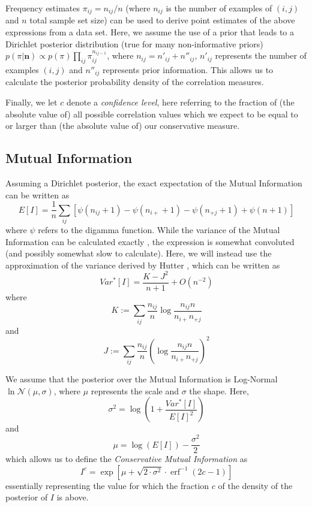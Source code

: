 \documentclass[conference]{IEEEtran}
\newcommand{\digamma}{\psi}
\newcommand{\lgammalocation}{\mu}
\newcommand{\lgammascale}{\sigma}
\DeclareMathOperator\erf{erf}
\begin{document}
Frequency estimates $\pi_{ij} = n_{ij} / n$ (where $n_{ij}$ is the number of examples of $(i,j)$ and $n$ total sample set size) can be used to derive point estimates of the above expressions from a data set. Here, we assume the use of a prior that leads to a Dirichlet posterior distribution (true for many non-informative priors) $p(\pi|\pmb{n}) \propto p(\pi) \prod_{ij} \pi_{ij}^{n_{ij-1}} $, where $n_{ij} = n'_{ij} + n''_{ij}$, $n'_{ij}$ represents the number of examples $(i,j)$ and $n''_{ij}$ represents prior information. This allows us to calculate the posterior probability density of the correlation measures.

Finally, we let $c$ denote a \emph{confidence level}, here referring to the fraction of (the absolute value of) all possible correlation values which we expect to be equal to or larger than (the absolute value of) our conservative measure.

\subsection{Mutual Information}

Assuming a Dirichlet posterior, the exact expectation of the Mutual Information can be written as
\begin{equation}
\label{eq:miexp}
E[I] = \frac{1}{n} \sum_{ij} [ \digamma(n_{ij} + 1) - \digamma(n_{i+} + 1) -
\digamma(n_{+j} + 1) + \digamma(n + 1) ]
\end{equation}
where $\digamma$ refers to the digamma function. While the variance of the Mutual Information can be calculated exactly \cite{Wolf-1993}, the expression is somewhat convoluted (and possibly somewhat slow to calculate). Here, we will instead use the approximation of the variance derived by Hutter \cite{Hutter-2001}, which can be written as
\begin{equation}
Var^*[I] = \frac{K - J^2}{n + 1} + O(n^{-2})
\end{equation}
where
\begin{equation}
K := \sum_{ij} \frac{n_{ij}}{n} \log \frac{n_{ij}n}{n_{i+}n_{+j}}
\end{equation}
and
\begin{equation}
J := \sum_{ij} \frac{n_{ij}}{n} \left( \log \frac{n_{ij}n}{n_{i+}n_{+j}} \right) ^ 2
\end{equation}

We assume that the posterior over the Mutual Information is Log-Normal $\ln \mathcal{N}(\mu, \sigma)$, where $\mu$ represents the scale and $\sigma$ the shape. Here,
\begin{equation}
\lgammascale^2 = \log \left( 1 + \frac{Var^*[I]}{E[I]^2} \right)
\end{equation}
and
\begin{equation}
\lgammalocation = \log(E[I]) - \frac{\lgammascale^2}{2}
\end{equation}
which allows us to define the \emph{Conservative Mutual Information} as
\begin{equation}
I^c = \exp[\lgammalocation + \sqrt{2 \cdot \lgammascale^2} \cdot \erf^{-1}(2c - 1)]
\end{equation}
essentially representing the value for which the fraction $c$ of the density of the posterior of $I$ is above.
\end{document}

